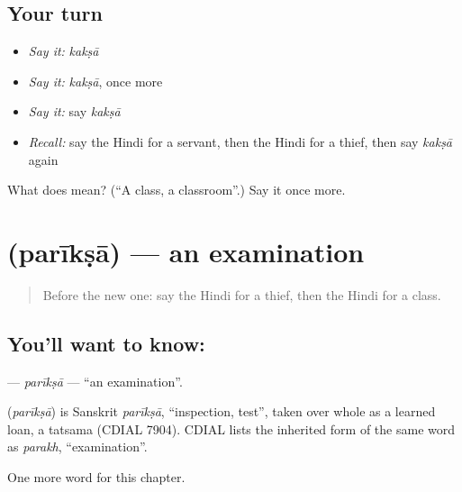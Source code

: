 \subsection*{Your turn}
\begin{itemize}
\raggedright
  \item \emph{Say it:} \emph{kakṣā}
  \item \emph{Say it:} \emph{kakṣā}, once more
  \item \emph{Say it:} say \emph{kakṣā}
  \item \emph{Recall:} say the Hindi for a servant, then the Hindi for a thief, then say \emph{kakṣā} again
\end{itemize}

\begin{tcolorbox}[breakable,colback=teal!4,colframe=teal!35!black,title={Before you move on}]
What does  mean? (\textquotedblleft{}A class, a classroom\textquotedblright{}.) Say it once more.
\end{tcolorbox}
\section[\texorpdfstring{\hi{परीक्षा} (parīkṣā)}{परीक्षा (parīkṣā)}]{ (parīkṣā) — an examination}

\label{lesson:HI-C197-pariksa}



\begin{quote}
Before the new one: say the Hindi for a thief, then the Hindi for a class.
\end{quote}

\subsection*{You'll want to know: }
\textbf{} — \emph{parīkṣā} — \textquotedblleft{}an examination\textquotedblright{}.

\begin{cousinweb}
\textbf{} (\emph{parīkṣā}) is Sanskrit \emph{parīkṣā}, \textquotedblleft{}inspection, test\textquotedblright{}, taken over whole as a learned loan, a tatsama (CDIAL 7904). CDIAL lists the inherited form of the same word as \emph{parakh}, \textquotedblleft{}examination\textquotedblright{}.
\end{cousinweb}

\begin{grammarlens}[title={What you've built}]
One more word for this chapter.
\end{grammarlens}

